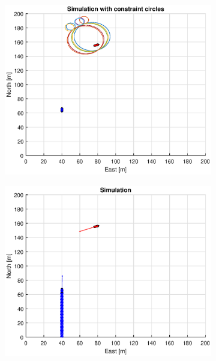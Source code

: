 \begin{figure}[!b]
\begin{subfigure}[b]{0.499\textwidth}
    \end{subfigure}
    \hfill
    \\
    \begin{subfigure}[b]{0.49\textwidth}
        \centering
        \includegraphics[width=\textwidth]{Images/Figures/sving_HO/Simple0_f1_Frame3}
    \end{subfigure}
    \hfill
    \begin{subfigure}[b]{0.499\textwidth}
        \centering
        \includegraphics[width=\textwidth]{Images/Figures/sving_HO/Simple0_f600_Frame3}
    \end{subfigure}
    \hfill
\end{figure}%

